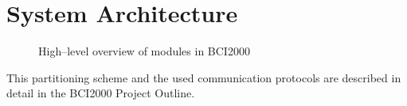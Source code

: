 \chapter{System Architecture}

\begin{figure}[ht]
 \centerline{}
 \caption{High--level overview of modules in BCI2000}
 \label{mod_overview}
\end{figure}

This partitioning scheme and the used communication protocols are described in 
detail in the BCI2000 Project Outline.




